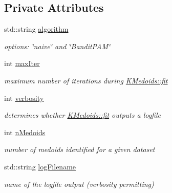 \subsection*{Private Attributes}
\begin{DoxyCompactItemize}
\item 
\mbox{\label{classKMedoids_a849662ecdbd5164ab37f4bd4f3223344}} 
std\+::string \hyperlink{classKMedoids_a849662ecdbd5164ab37f4bd4f3223344}{algorithm}
\begin{DoxyCompactList}\small\item\em options\+: \char`\"{}naive\char`\"{} and \char`\"{}\+Bandit\+P\+A\+M\char`\"{} \end{DoxyCompactList}\item 
\mbox{\label{classKMedoids_a42d3da6b39908d44ed383c6beea55668}} 
int \hyperlink{classKMedoids_a42d3da6b39908d44ed383c6beea55668}{max\+Iter}
\begin{DoxyCompactList}\small\item\em maximum number of iterations during \hyperlink{classKMedoids_ae241800e72a6b4a677333ffbf06e1798}{K\+Medoids\+::fit} \end{DoxyCompactList}\item 
\mbox{\label{classKMedoids_a8d319c1a783be7c06205bf855b4976b5}} 
int \hyperlink{classKMedoids_a8d319c1a783be7c06205bf855b4976b5}{verbosity}
\begin{DoxyCompactList}\small\item\em determines whether \hyperlink{classKMedoids_ae241800e72a6b4a677333ffbf06e1798}{K\+Medoids\+::fit} outputs a logfile \end{DoxyCompactList}\item 
\mbox{\label{classKMedoids_a2de8fdd200f9963c3cf9e1f824d1af7b}} 
int \hyperlink{classKMedoids_a2de8fdd200f9963c3cf9e1f824d1af7b}{n\+Medoids}
\begin{DoxyCompactList}\small\item\em number of medoids identified for a given dataset \end{DoxyCompactList}\item 
\mbox{\label{classKMedoids_a3cf57e612442072fb377b1714fc5e12e}} 
std\+::string \hyperlink{classKMedoids_a3cf57e612442072fb377b1714fc5e12e}{log\+Filename}
\begin{DoxyCompactList}\small\item\em name of the logfile output (verbosity permitting) \end{DoxyCompactList}\item 

\end{DoxyCompactItemize}

